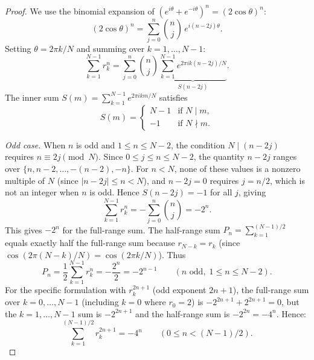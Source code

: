 \documentclass[aip,jmp,reprint,superscriptaddress,floatfix,nofootinbib]{revtex4-2}
\theoremstyle{definition}
\theoremstyle{remark}
\begin{document}
\begin{proof}
We use the binomial expansion of $(e^{i\theta} + e^{-i\theta})^n
= (2\cos\theta)^n$:
\begin{equation}\label{eq:binom-cos}
(2\cos\theta)^n = \sum_{j=0}^{n} \binom{n}{j}\, e^{i(n-2j)\theta}.
\end{equation}
Setting $\theta = 2\pi k/N$ and summing over $k = 1, \ldots, N{-}1$:
\begin{equation}\label{eq:full-sum}
\sum_{k=1}^{N-1} r_k^n
  = \sum_{j=0}^{n} \binom{n}{j}
    \underbrace{\sum_{k=1}^{N-1} e^{2\pi i k(n-2j)/N}}_{S(n-2j)}.
\end{equation}
The inner sum $S(m) = \sum_{k=1}^{N-1} e^{2\pi i km/N}$ satisfies
\begin{equation}\label{eq:roots-unity}
S(m) = \begin{cases} N - 1 & \text{if } N \mid m, \\
  -1 & \text{if } N \nmid m. \end{cases}
\end{equation}

\emph{Odd case.}  When $n$ is odd and $1 \le n \le N{-}2$, the
condition $N \mid (n - 2j)$ requires $n \equiv 2j \pmod{N}$.
Since $0 \le j \le n \le N{-}2$, the quantity $n - 2j$ ranges over
$\{n, n{-}2, \ldots, -(n{-}2), -n\}$.  For $n < N$, none of these
values is a nonzero multiple of $N$ (since $|n - 2j| \le n < N$),
and $n - 2j = 0$ requires $j = n/2$, which is not an integer when
$n$ is odd.  Hence $S(n-2j) = -1$ for all $j$, giving
\begin{equation}
\sum_{k=1}^{N-1} r_k^n = -\sum_{j=0}^{n}\binom{n}{j} = -2^n.
\end{equation}
This gives $-2^n$ for the full-range sum.  The half-range
sum $P_n = \sum_{k=1}^{(N-1)/2}$ equals exactly half the full-range
sum because $r_{N-k} = r_k$ (since
$\cos(2\pi(N{-}k)/N) = \cos(2\pi k/N)$).  Thus
\begin{equation}
P_n = \frac{1}{2}\sum_{k=1}^{N-1} r_k^n = -\frac{2^n}{2} = -2^{n-1}
  \qquad (n \text{ odd},\; 1 \le n \le N{-}2).
\end{equation}
For the specific formulation with $r_k^{2n+1}$ (odd exponent $2n+1$),
the full-range sum over $k = 0, \ldots, N{-}1$ (including $k = 0$
where $r_0 = 2$) is $-2^{2n+1} + 2^{2n+1} = 0$, but the
$k = 1, \ldots, N{-}1$ sum is $-2^{2n+1}$ and the half-range sum is
$-2^{2n} = -4^n$.  Hence:
\begin{equation}\label{eq:odd-final}
\boxed{\sum_{k=1}^{(N-1)/2} r_k^{2n+1} = -4^n}
  \qquad (0 \le n < (N{-}1)/2).
\end{equation}


\end{proof}
\end{document}
